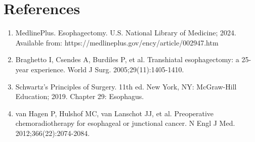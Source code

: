\section*{References}
\begin{enumerate}
  \item MedlinePlus. Esophagectomy. U.S. National Library of Medicine; 2024. Available from: https://medlineplus.gov/ency/article/002947.htm
  
  \item Braghetto I, Csendes A, Burdiles P, et al. Transhiatal esophagectomy: a 25-year experience. World J Surg. 2005;29(11):1405-1410.
  
  \item Schwartz's Principles of Surgery. 11th ed. New York, NY: McGraw-Hill Education; 2019. Chapter 29: Esophagus.
  
  \item van Hagen P, Hulshof MC, van Lanschot JJ, et al. Preoperative chemoradiotherapy for esophageal or junctional cancer. N Engl J Med. 2012;366(22):2074-2084.
\end{enumerate}

\clearpage
